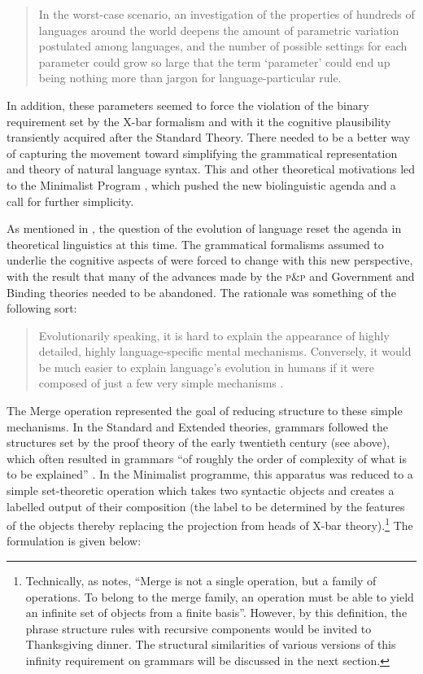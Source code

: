 \documentclass[output=paper]{langscibook}
\begin{document}
\begin{quote}
In the worst-case scenario, an investigation of the properties of hundreds of languages around the world deepens the amount of parametric variation postulated among languages, and the number of possible settings for each parameter could grow so large that the term \textquoteleft{}parameter' could end up being nothing more than jargon for language-particular rule. \citep[64]{Newmeyer1996}
\end{quote}

In addition, these parameters seemed to force the violation of the binary requirement set by the X-bar formalism and with it the cognitive plausibility transiently acquired after the Standard Theory. There needed to be a better way of capturing the movement toward simplifying the grammatical representation and theory of natural language syntax. This and other theoretical motivations led to the Minimalist Program \citep{Chomsky1995MP}, which pushed the new biolinguistic agenda and a call for further simplicity. 

As mentioned in , the question of the evolution of language reset the agenda in theoretical linguistics at this time. The grammatical formalisms assumed to underlie the cognitive aspects of  were forced to change with this new perspective, with the result that many of the advances made by the \textsc{p\&p} and Government and Binding \citep{Chomsky1981} theories needed to be abandoned. The rationale was something of the following sort:

\begin{quote}
Evolutionarily speaking, it is hard to explain the appearance of highly detailed, highly language-specific mental mechanisms. Conversely, it would be much easier to explain language's evolution in humans if it were composed of just a few very simple mechanisms \citep[175]{Johnson2015}.
\end{quote}

The Merge operation represented the goal of reducing structure to these simple mechanisms. In the Standard and Extended theories, grammars followed the structures set by the proof theory of the early twentieth century (see above), which often resulted in grammars ``of roughly the order of complexity of what is to be explained'' \citep[233]{Chomsky1995}. In the Minimalist programme, this apparatus was reduced to a simple set-theoretic operation which takes two syntactic objects and creates a labelled output of their composition (the label to be determined by the features of the objects thereby replacing the projection from heads of X-bar theory).\footnote{Technically, as \citet[307]{Langendoen:2003} notes, ``Merge is not a single operation, but a family of operations. To belong to the merge family, an operation must be able to yield an infinite set of objects from a finite basis''. However, by this definition, the phrase structure rules with recursive components would be invited to Thanksgiving dinner. The structural similarities of various versions of this infinity requirement on grammars will be discussed in the next section.} The formulation is given below:
\end{document}
